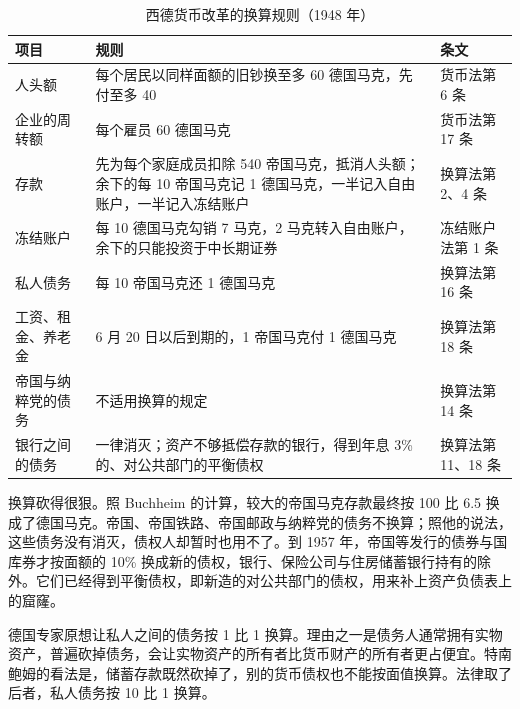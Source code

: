 \begin{table}[tbp]
\centering\small
\caption{西德货币改革的换算规则（1948 年）}\label{tab:reconstruction-conversion}
\begin{tabularx}{\linewidth}{@{}l X l@{}}
\toprule
项目 & 规则 & 条文 \\
\midrule
人头额 & 每个居民以同样面额的旧钞换至多 60 德国马克，先付至多 40 & 货币法第 6 条 \\
企业的周转额 & 每个雇员 60 德国马克 & 货币法第 17 条 \\
存款 & 先为每个家庭成员扣除 540 帝国马克，抵消人头额；余下的每 10 帝国马克记 1 德国马克，一半记入自由账户，一半记入冻结账户 & 换算法第 2、4 条 \\
冻结账户 & 每 10 德国马克勾销 7 马克，2 马克转入自由账户，余下的只能投资于中长期证券 & 冻结账户法第 1 条 \\
私人债务 & 每 10 帝国马克还 1 德国马克 & 换算法第 16 条 \\
工资、租金、养老金 & 6 月 20 日以后到期的，1 帝国马克付 1 德国马克 & 换算法第 18 条 \\
帝国与纳粹党的债务 & 不适用换算的规定 & 换算法第 14 条 \\
银行之间的债务 & 一律消灭；资产不够抵偿存款的银行，得到年息 3\% 的、对公共部门的平衡债权 & 换算法第 11、18 条 \\
\bottomrule
\end{tabularx}
\end{table}

换算砍得很狠。照 Buchheim 的计算，较大的帝国马克存款最终按 100 比 6.5 换成了德国马克\cite{buchheim1988}。帝国、帝国铁路、帝国邮政与纳粹党的债务不换算；照他的说法，这些债务没有消灭，债权人却暂时也用不了\cite{buchheim1988}。到 1957 年，帝国等发行的债券与国库券才按面额的 10\% 换成新的债权，银行、保险公司与住房储蓄银行持有的除外\cite{buchheim1988}。它们已经得到平衡债权，即新造的对公共部门的债权，用来补上资产负债表上的窟窿\cite{buchheim1988}。

德国专家原想让私人之间的债务按 1 比 1 换算。理由之一是债务人通常拥有实物资产，普遍砍掉债务，会让实物资产的所有者比货币财产的所有者更占便宜\cite{buchheim1988}。特南鲍姆的看法是，储蓄存款既然砍掉了，别的货币债权也不能按面值换算\cite{buchheim1988}。法律取了后者，私人债务按 10 比 1 换算\cite{umstellungsgesetz1948}。

